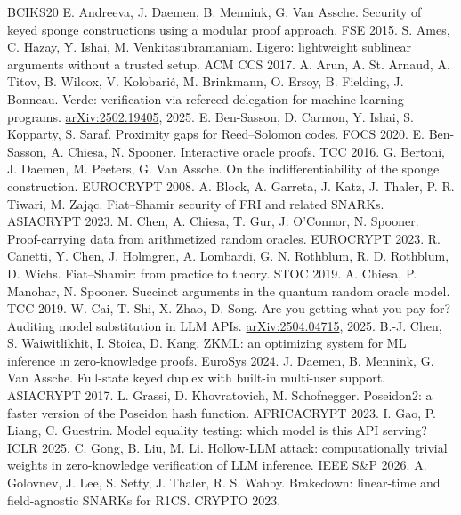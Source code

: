 \documentclass[10pt]{article}
\begin{document}
\begin{thebibliography}{BCIKS20}
 E. Andreeva, J. Daemen, B. Mennink, G. Van Assche. Security of keyed sponge constructions using a modular proof approach. FSE 2015.
 S. Ames, C. Hazay, Y. Ishai, M. Venkitasubramaniam. Ligero: lightweight sublinear arguments without a trusted setup. ACM CCS 2017.
 A. Arun, A. St. Arnaud, A. Titov, B. Wilcox, V. Kolobari\'c, M. Brinkmann, O. Ersoy, B. Fielding, J. Bonneau. Verde: verification via refereed delegation for machine learning programs. \href{https://arxiv.org/abs/2502.19405}{arXiv:2502.19405}, 2025.
 E. Ben-Sasson, D. Carmon, Y. Ishai, S. Kopparty, S. Saraf. Proximity gaps for Reed--Solomon codes. FOCS 2020.
 E. Ben-Sasson, A. Chiesa, N. Spooner. Interactive oracle proofs. TCC 2016.
 G. Bertoni, J. Daemen, M. Peeters, G. Van Assche. On the indifferentiability of the sponge construction. EUROCRYPT 2008.
 A. Block, A. Garreta, J. Katz, J. Thaler, P. R. Tiwari, M. Zaj\k{a}c. Fiat--Shamir security of FRI and related SNARKs. ASIACRYPT 2023.
 M. Chen, A. Chiesa, T. Gur, J. O'Connor, N. Spooner. Proof-carrying data from arithmetized random oracles. EUROCRYPT 2023.
 R. Canetti, Y. Chen, J. Holmgren, A. Lombardi, G. N. Rothblum, R. D. Rothblum, D. Wichs. Fiat--Shamir: from practice to theory. STOC 2019.
 A. Chiesa, P. Manohar, N. Spooner. Succinct arguments in the quantum random oracle model. TCC 2019.
 W. Cai, T. Shi, X. Zhao, D. Song. Are you getting what you pay for? Auditing model substitution in LLM APIs. \href{https://arxiv.org/abs/2504.04715}{arXiv:2504.04715}, 2025.
 B.-J. Chen, S. Waiwitlikhit, I. Stoica, D. Kang. ZKML: an optimizing system for ML inference in zero-knowledge proofs. EuroSys 2024.
 J. Daemen, B. Mennink, G. Van Assche. Full-state keyed duplex with built-in multi-user support. ASIACRYPT 2017.
 L. Grassi, D. Khovratovich, M. Schofnegger. Poseidon2: a faster version of the Poseidon hash function. AFRICACRYPT 2023.
 I. Gao, P. Liang, C. Guestrin. Model equality testing: which model is this API serving? ICLR 2025.
 C. Gong, B. Liu, M. Li. Hollow-LLM attack: computationally trivial weights in zero-knowledge verification of LLM inference. IEEE S\&P 2026.
 A. Golovnev, J. Lee, S. Setty, J. Thaler, R. S. Wahby. Brakedown: linear-time and field-agnostic SNARKs for R1CS. CRYPTO 2023.

\end{thebibliography}
\end{document}
